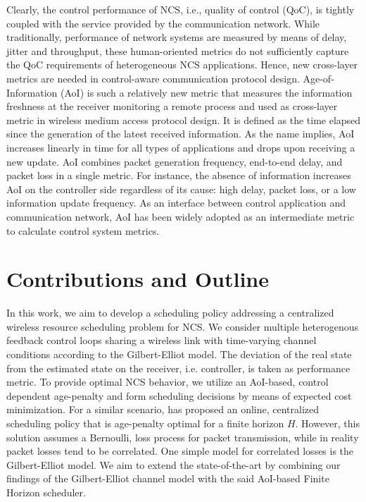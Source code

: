 Clearly, the control performance of NCS, i.e., quality of control (QoC), is
tightly coupled with the service provided by the communication network. While
traditionally, performance of network systems are measured by means of delay,
jitter and throughput, these human-oriented metrics do not sufficiently capture
the QoC requirements of heterogeneous NCS applications. Hence, new cross-layer
metrics are needed in control-aware communication protocol design.
Age-of-Information (AoI) is such a relatively new metric that measures the
information freshness at the receiver monitoring a remote process
\cite{kaul2012real} and used as cross-layer metric in wireless medium access
protocol design. It is defined as the time elapsed since the generation of the
latest received information. As the name implies, AoI increases linearly in time
for all types of applications and drops upon receiving a new update. AoI
combines packet generation frequency, end-to-end delay, and packet loss in a
single metric. For instance, the absence of information increases AoI on the
controller side regardless of its cause: high delay, packet loss, or a low
information update frequency. As an interface between control application and
communication network, AoI has been widely adopted as an intermediate metric to
calculate control system metrics. 


\section*{Contributions and Outline}
In this work, we aim to develop a scheduling policy addressing a centralized
wireless resource scheduling problem for NCS. We consider multiple heterogenous
feedback control loops sharing a wireless link with time-varying channel
conditions according to the Gilbert-Elliot model. The deviation of the real
state from the estimated state on the receiver, i.e. controller, is taken as
performance metric. To provide optimal NCS behavior, we utilize an AoI-based,
control dependent age-penalty and form scheduling decisions by means of expected
cost minimization. For a similar scenario, \cite{ayan2020aoi} has proposed an
online, centralized scheduling policy that is age-penalty optimal for a finite
horizon $H$. However, this solution assumes a Bernoulli, loss process for packet
transmission, while in reality packet losses tend to be correlated. One simple
model for correlated losses is the Gilbert-Elliot model. We aim to extend the
state-of-the-art by combining our findings of the Gilbert-Elliot channel model
with the said AoI-based Finite Horizon scheduler.

